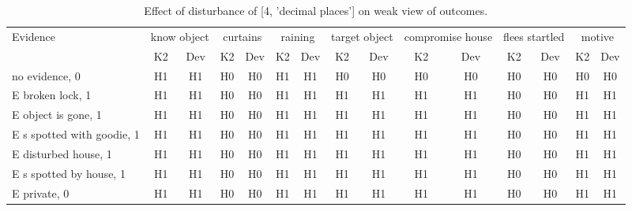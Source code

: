 \begin{table}\begin{tabular}{l|cc|cc|cc|cc|cc|cc|cc}\toprule\multirow{2}{*}{Evidence} & \multicolumn{2}{c}{know object}& \multicolumn{2}{c}{curtains}& \multicolumn{2}{c}{raining}& \multicolumn{2}{c}{target object}& \multicolumn{2}{c}{compromise house}& \multicolumn{2}{c}{flees startled}& \multicolumn{2}{c}{motive}\\& {K2} & {Dev}& {K2} & {Dev}& {K2} & {Dev}& {K2} & {Dev}& {K2} & {Dev}& {K2} & {Dev}& {K2} & {Dev}\\\midrule
no evidence, 0 & H1&H1&H0&H0&H1&H1&H0&H0&H0&H0&H0&H0&H0&H0\\E broken lock, 1 & H1&H1&H0&H0&H1&H1&H1&H1&H1&H1&H0&H0&H1&H1\\E object is gone, 1 & H1&H1&H0&H0&H1&H1&H1&H1&H1&H1&H0&H0&H1&H1\\E s spotted with goodie, 1 & H1&H1&H0&H0&H1&H1&H1&H1&H1&H1&H0&H0&H1&H1\\E disturbed house, 1 & H1&H1&H0&H0&H1&H1&H1&H1&H1&H1&H0&H0&H1&H1\\E s spotted by house, 1 & H1&H1&H0&H0&H1&H1&H1&H1&H1&H1&H0&H0&H1&H1\\E private, 0 & H1&H1&H0&H0&H1&H1&H1&H1&H1&H1&H0&H0&H1&H1\\\bottomrule\end{tabular}\caption{Effect of disturbance of [4, 'decimal places'] on weak view of outcomes.}\end{table}